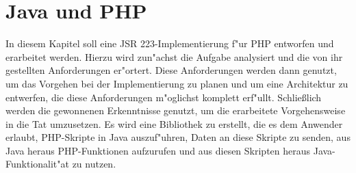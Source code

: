 \chapter{Java und PHP}
\label{sec:chap1}

In diesem Kapitel soll eine JSR 223-Implementierung f"ur PHP entworfen und erarbeitet werden. Hierzu wird zun"achst
die Aufgabe analysiert und die von ihr gestellten Anforderungen er"ortert. Diese Anforderungen werden dann genutzt,
um das Vorgehen bei der Implementierung zu planen  und um eine Architektur zu entwerfen, die diese Anforderungen 
m"oglichst komplett erf"ullt. Schlie\ss lich werden die gewonnenen Erkenntnisse genutzt, um die erarbeitete Vorgehensweise
in die Tat umzusetzen. Es wird eine Bibliothek zu erstellt, die es dem Anwender erlaubt, PHP-Skripte in Java auszuf"uhren,
Daten an diese Skripte zu senden, aus Java heraus PHP-Funktionen aufzurufen und aus diesen Skripten heraus 
Java-Funktionalit"at zu nutzen.


\clearpage

\clearpage

\clearpage



